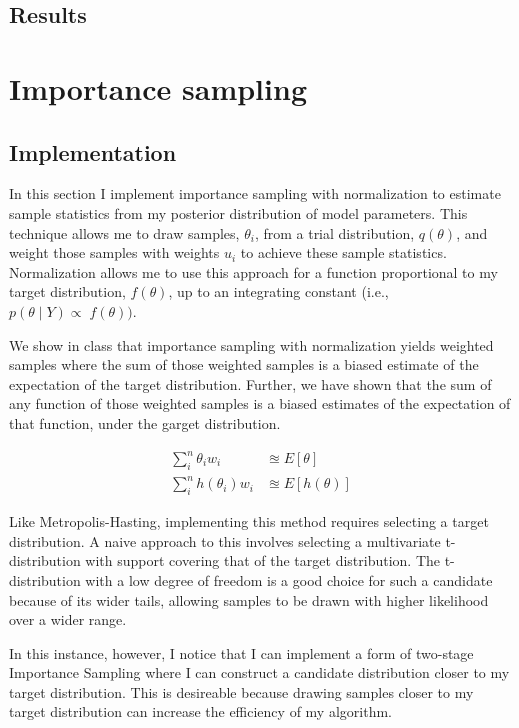 \documentclass{article}
\begin{document}
\subsection*{Results}


\section{Importance sampling}
\subsection{Implementation}
In this section I implement importance sampling with normalization to estimate sample statistics from my posterior distribution of model parameters. This technique allows me to draw samples, $\theta_i$, from a trial distribution, $q(\theta)$, and weight those samples with weights $u_i$ to achieve these sample statistics. Normalization allows me to use this approach for a function proportional to my target distribution, $f(\theta)$, up to an integrating constant (i.e., $p(\theta \mid Y) \propto\; f(\theta))$.

We show in class that importance sampling with normalization yields weighted samples where the sum of those weighted samples is a biased estimate of the expectation of the target distribution. Further, we have shown that the sum of any function of those weighted samples is a biased estimates of the expectation of that function, under the garget distribution.

\begin{align}
  \sum_i^n\theta_i w_i &\approxeq E\left[ \theta\right]\\
  \sum_i^nh(\theta_i)w_i &\approxeq E\left[ h(\theta) \right]
\end{align}

Like Metropolis-Hasting, implementing this method requires selecting a target distribution. A naive approach to this involves selecting a multivariate t-distribution with support covering that of the target distribution. The t-distribution with a low degree of freedom is a good choice for such a candidate because of its wider tails, allowing samples to be drawn with higher likelihood over a wider range. 

In this instance, however, I notice that I can implement a form of two-stage Importance Sampling where I can construct a candidate distribution closer to my target distribution. This is desireable because drawing samples closer to my target distribution can increase the efficiency of my algorithm.
\end{document}
